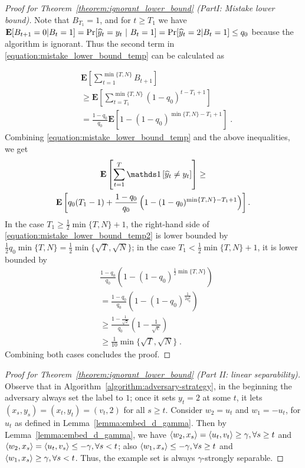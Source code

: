 \begin{proof}[Proof for Theorem~\ref{theorem:ignorant_lower_bound} (PartI: Mistake lower bound)]
Note that $B_{T_1}=1$, and for $t \ge T_1$ we have
$\operatorname*{\mathbf{E}}[B_{t+1}=0|B_t=1]=\Pr[\widehat y_t=y_t~|~B_t=1] = \Pr[\widehat y_t=2|B_t=1] \le
q_0$ because the algorithm is ignorant. Thus the second term in
\eqref{equation:mistake_lower_bound_temp} can be calculated as

\begin{align*}
& \mathbf{E}\left[\sum_{t=1}^{\min\{T,N\}}B_{t+1}\right] \\
& \ge \mathbf{E}\left[\sum_{t=T_1}^{\min\{ T,N \}} (1-q_0)^{t-T_1+1} \right] \\
& = \frac{1-q_0}{q_0}\mathbf{E}\left[1-(1-q_0)^{\min\{T,N\}-T_1+1}\right] \; .
\end{align*}
Combining \eqref{equation:mistake_lower_bound_temp} and the above inequalities, we get
\begin{multline}
\label{equation:mistake_lower_bound_temp2}
\mathbf{E} \left[\sum_{t=1}^T \indicator{\widehat y_t\neq y_t}\right] \ge
\\ \mathbf{E}\left[q_0(T_1-1)+\frac{1-q_0}{q_0}\left(1-(1-q_0)^{\min\{T,N\}-T_1+1}\right)\right].
\end{multline}
In the case $T_1\ge \frac{1}{2}\min\{T,N\}+1$, the right-hand side of
\eqref{equation:mistake_lower_bound_temp2} is lower bounded by
$\frac{1}{2}q_0\min\{T,N\}=\frac{1}{2}\min\{\sqrt{T}, \sqrt{N}\}$; in the case
$T_1< \frac{1}{2}\min\{T,N\}+1$, it is lower bounded by
\begin{align*}
& \frac{1-q_0}{q_0}\left(1-(1-q_0)^{\frac{1}{2}\min\{T,N\}}\right) \\
& = \frac{1-q_0}{q_0}\left(1-(1-q_0)^{\frac{1}{2q_0^2}}\right) \\
& \ge \frac{1-\frac{1}{\sqrt{2}}}{q_0}\left(1-\frac{1}{\sqrt{e}}\right) \\
& \ge \frac{1}{10}\min\{\sqrt{T}, \sqrt{N}\} \; .
\end{align*}
Combining both cases concludes the proof.
\end{proof}

\begin{proof}[Proof for Theorem~\ref{theorem:ignorant_lower_bound} (Part II: linear separability)]
Observe that in Algorithm~\ref{algorithm:adversary-strategy}, in the beginning
the adversary always set the label to $1$; once it sets $y_t=2$ at some $t$, it
lets $(x_s, y_s)=(x_t, y_t)=(v_t, 2)$ for all $s\ge t$. Consider $w_2=u_t$ and
$w_1=-u_t$, for $u_t$ as defined in Lemma~\ref{lemma:embed_d_gamma}. Then by
Lemma~\ref{lemma:embed_d_gamma}, we have $\left\langle w_2, x_s \right\rangle = \left\langle u_t, v_t \right\rangle \ge
\gamma, \forall s \ge t$ and $\left\langle w_2, x_s \right\rangle = \left\langle u_t, v_s \right\rangle \le - \gamma,
\forall s< t$; also $\left\langle w_1, x_s \right\rangle \le -\gamma, \forall s \ge t$ and
$\left\langle w_1, x_s \right\rangle \ge  \gamma, \forall s<t$. Thus, the example set is always
$\gamma$-strongly separable.
\end{proof}

